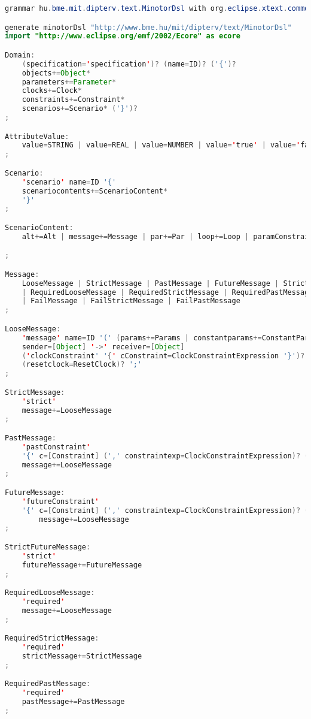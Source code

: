 \begin{lstlisting}[language=java, caption={\textit{Xtext} nyelvtan specifikációja.},captionpos=b,label=xtext_tpsc_grammar]
grammar hu.bme.mit.dipterv.text.MinotorDsl with org.eclipse.xtext.common.Terminals

generate minotorDsl "http://www.bme.hu/mit/dipterv/text/MinotorDsl"
import "http://www.eclipse.org/emf/2002/Ecore" as ecore

Domain:
	(specification='specification')? (name=ID)? ('{')?
	objects+=Object*
	parameters+=Parameter*
	clocks+=Clock*
	constraints+=Constraint*
	scenarios+=Scenario* ('}')?
;

AttributeValue:
	value=STRING | value=REAL | value=NUMBER | value='true' | value='false'
;

Scenario:
	'scenario' name=ID '{'
	scenariocontents+=ScenarioContent*
	'}'
;

ScenarioContent:
	alt+=Alt | message+=Message | par+=Par | loop+=Loop | paramConstraint+=ParameterConstraint

;

Message:
	LooseMessage | StrictMessage | PastMessage | FutureMessage | StrictFutureMessage
	| RequiredLooseMessage | RequiredStrictMessage | RequiredPastMessage | RequiredFutureMessage | RequiredStrictFutureMessage
	| FailMessage | FailStrictMessage | FailPastMessage
;

LooseMessage:
	'message' name=ID '(' (params+=Params | constantparams+=ConstantParams) ')'
	sender=[Object] '->' receiver=[Object]
	('clockConstraint' '{' cConstraint=ClockConstraintExpression '}')? 
	(resetclock=ResetClock)? ';'
;

StrictMessage:
	'strict'
	message+=LooseMessage
;

PastMessage:
	'pastConstraint'
	'{' c=[Constraint] (',' constraintexp=ClockConstraintExpression)? (',' resetinconstraint=ResetClock)? '}'
	message+=LooseMessage
;

FutureMessage:
	'futureConstraint'
	'{' c=[Constraint] (',' constraintexp=ClockConstraintExpression)? (',' resetinconstraint=ResetClock)? '}'
		message+=LooseMessage
;

StrictFutureMessage:
	'strict'
	futureMessage+=FutureMessage
;

RequiredLooseMessage:
	'required'
	message+=LooseMessage
;

RequiredStrictMessage:
	'required'
	strictMessage+=StrictMessage
;

RequiredPastMessage:
	'required'
	pastMessage+=PastMessage
;


\end{lstlisting}
